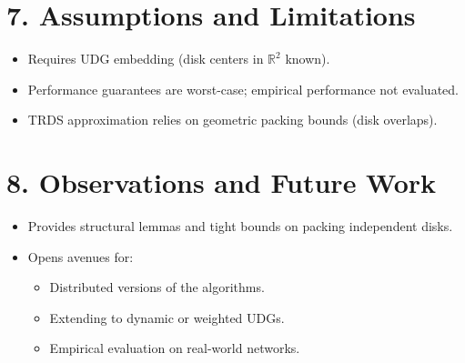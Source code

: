 \documentclass{article}
\begin{document}
\section*{7. Assumptions and Limitations}
\begin{itemize}[leftmargin=1.5em]
    \item Requires UDG embedding (disk centers in \( \mathbb{R}^2 \) known).
    \item Performance guarantees are worst-case; empirical performance not evaluated.
    \item TRDS approximation relies on geometric packing bounds (disk overlaps).
\end{itemize}

\section*{8. Observations and Future Work}
\begin{itemize}[leftmargin=1.5em]
    \item Provides structural lemmas and tight bounds on packing independent disks.
    \item Opens avenues for:
    \begin{itemize}
        \item Distributed versions of the algorithms.
        \item Extending to dynamic or weighted UDGs.
        \item Empirical evaluation on real-world networks.
    \end{itemize}
\end{itemize}
\end{document}
